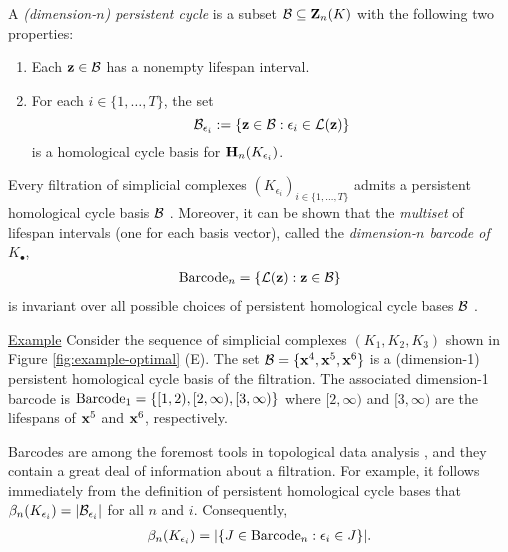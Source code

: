 A \emph{(dimension-$n$) persistent \DIFdelbegin {}\DIFdelend \DIFaddbegin {}\DIFaddend cycle \DIFdelbegin {}\DIFdelend \DIFaddbegin {}\DIFaddend } is a subset $\mathcal B \subseteq \mathbf{Z}_n(K)$ with the following two properties:
    \begin{enumerate}
    \item Each ${\mathbf z} \in \mathcal B$ has a nonempty lifespan interval.
    \item For each $i \in \{1, \ldots, T\}$, the set 
        $$
        \mathcal B_{\epsilon_i} 
        := 
        \{{\mathbf z} \in \mathcal B : \epsilon_i \in \mathcal{L}({\mathbf z}) \}
        $$
    is a homological cycle basis for $\mathbf{H}_n(K_{\epsilon_i})$.
    \end{enumerate}

 
Every filtration of simplicial complexes $ (K_{\epsilon_i})_{i \in\{ 1, \ldots, T\}}$ admits a  persistent homological cycle basis  $\mathcal B$ \cite{zomorodiancarlssoncomputingph}.  
Moreover, it can be shown that the \emph{multiset} of lifespan intervals (one for each basis vector), called the \emph{dimension-$n$ barcode of $K_\bullet$},
    \begin{align*}
        \mathrm{Barcode}_n = 
        \{ \mathcal{L}({\mathbf z}) : {\mathbf z} \in \mathcal B \}
    \end{align*}
is invariant over all possible choices of persistent homological cycle bases $\mathcal B$ \cite{zomorodiancarlssoncomputingph}.  

\noindent \underline{Example}  Consider the sequence of simplicial complexes $(K_1, K_2, K_3)$ shown in Figure \ref{fig:example-optimal} (E).  The set
    $
        \mathcal B = \{\mathbf{x}^4, \mathbf{x}^5, \mathbf{x}^6 \}
    $
is a (dimension-1) persistent homological cycle basis of the filtration.  The associated dimension-1 barcode is     
    $
    \mathrm{Barcode}_1 = \{[1,2), [2,\infty), [3, \infty) \} 
    $ 
where $[2,\infty)$ and $[3,\infty)$ are the lifespans of  $\mathbf{x}^5$ and $\mathbf{x}^6$, respectively.

Barcodes are among the foremost tools in topological data analysis \cite{barcodeGhrist,  persistenthomologyasurvey}, and they contain a great deal of information about a filtration.  For example, it follows  immediately from the definition of persistent homological cycle bases  that
    $
        \beta_n(K_{\epsilon_i})
        =
        |\mathcal B_{\epsilon_i}|
    $
for all $n$ and $i$.  Consequently,
    \begin{align*}
        \beta_n(K_{\epsilon_i})
        =
        |\{J \in \mathrm{Barcode}_n : \epsilon_i \in J \}|.
    \end{align*}

